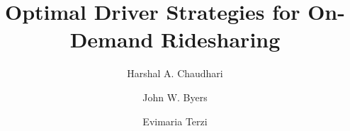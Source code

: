 \documentclass[sigconf]{acmart}
\begin{document}
\title{Optimal Driver Strategies for On-Demand Ridesharing}

\author{Harshal A. Chaudhari}

\author{John W. Byers}

\author{Evimaria Terzi}


%
%
% 





\maketitle








%
 
\end{document}
